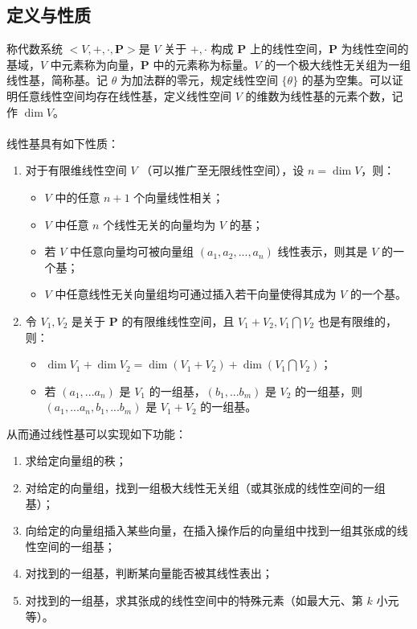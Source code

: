 \documentclass[12pt,a4paper]{article}
\begin{document}
\subsection{定义与性质}
称代数系统 $<V,+,\cdot,\mathbf{P}>$是 $V$ 关于 $+,\cdot$ 构成 $\mathbf{P}$ 上的线性空间，$\mathbf{P}$ 为线性空间的基域，$V$ 中元素称为向量，$\mathbf{P}$ 中的元素称为标量。$V$ 的一个极大线性无关组为一组线性基，简称基。记 $\theta$ 为加法群的零元，规定线性空间 $\{\theta\}$ 的基为空集。可以证明任意线性空间均存在线性基，定义线性空间 $V$ 的维数为线性基的元素个数，记作 $\dim V$。\\
\\
线性基具有如下性质：
\begin{enumerate}
	\item 对于有限维线性空间 $V$ （可以推广至无限线性空间），设 $n=\dim V$，则：
	\begin{itemize}
		\item $V$ 中的任意 $n+1$ 个向量线性相关；
		\item $V$ 中任意 $n$ 个线性无关的向量均为 $V$ 的基；
		\item 若 $V$ 中任意向量均可被向量组 $(a_1,a_2,...,a_n)$ 线性表示，则其是 $V$ 的一个基；
		\item $V$ 中任意线性无关向量组均可通过插入若干向量使得其成为 $V$ 的一个基。
	\end{itemize}
	\item 令 $V_1,V_2$ 是关于 $\mathbf{P}$ 的有限维线性空间，且 $V_1+V_2,V_1\bigcap V_2$ 也是有限维的，则：
	\begin{itemize}
		\item $\dim V_1+\dim V_2=\dim (V_1+V_2)+\dim(V_1\bigcap V_2)$；
		\item 若 $(a_1,...a_n)$ 是 $V_1$ 的一组基，$(b_1,...b_m)$ 是 $V_2$ 的一组基，则 $(a_1,...a_n,b_1,...b_m)$ 是 $V_1+V_2$ 的一组基。
	\end{itemize}
\end{enumerate}
从而通过线性基可以实现如下功能：
\begin{enumerate}
	\item 求给定向量组的秩；
	\item 对给定的向量组，找到一组极大线性无关组（或其张成的线性空间的一组基）；
	\item 向给定的向量组插入某些向量，在插入操作后的向量组中找到一组其张成的线性空间的一组基；
	\item 对找到的一组基，判断某向量能否被其线性表出；
	\item 对找到的一组基，求其张成的线性空间中的特殊元素（如最大元、第 $k$ 小元等）。
\end{enumerate}
\end{document}
